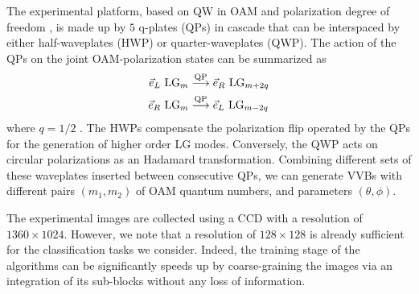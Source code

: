 \documentclass[
    floatfix, aps, pra, superscriptaddress,
	10pt, twocolumn,
    nofootinbib,
	tightenlines
]{revtex4-1}
\begin{document}
The experimental platform, based on \ac{QW} in \ac{OAM} and polarization degree of freedom \cite{cardano2015quantum,Innocenti2017,giordani_2018}, is made up by $5$ q-plates (QPs) in cascade that can be interspaced by either half-waveplates (HWP) or quarter-waveplates (QWP). 
The action of the QPs on the joint OAM-polarization states can be summarized as 
\begin{align}
    \Vec{e}_L \text{ LG}_m &\stackrel{\text{QP}}{\longrightarrow} \Vec{e}_R\text{ LG}_{m+2q} \notag\\ \Vec{e}_R \text{ LG}_m &\stackrel{\text{QP}}{\longrightarrow} \Vec{e}_L\text{ LG}_{m-2q}
    \label{eq_si:qplate}
\end{align}
where $q=1/2$ \cite{marrucci-2006spin-to-orbital}. The HWPs compensate the polarization flip operated by the QPs for the generation of higher order \ac{LG} modes. Conversely, the QWP acts on circular polarizations as an Hadamard transformation. Combining different sets of these waveplates inserted between consecutive QPs, we can generate \acp{VVB} with different pairs $(m_1,m_2)$ of OAM quantum numbers, and parameters $(\theta, \phi)$.


The experimental images are collected using a \ac{CCD} with a resolution of $1360 \times 1024$. 
However, we note that a resolution of $128 \times 128$ is already sufficient for the classification tasks we consider. Indeed, the training stage of the algorithms can be significantly speeds up by coarse-graining the images via an integration of its sub-blocks without any loss of information. 
\end{document}
